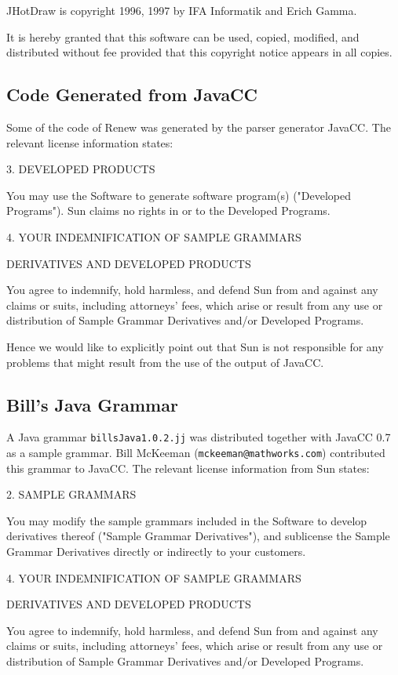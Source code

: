 \begin{licensequote}
JHotDraw is copyright 1996, 1997 by IFA Informatik and Erich Gamma.

It is hereby granted that this software can be used, copied, modified, 
and distributed without fee provided that this copyright notice appears 
in all copies.
\end{licensequote}


\subsection{Code Generated from JavaCC}

Some of the code of Renew was generated by the parser generator
JavaCC. The relevant license information states:

\begin{licensequote}
3. DEVELOPED PRODUCTS

You may use the Software to generate software program(s) ("Developed
Programs").  Sun claims no rights in or to the Developed Programs.

\medskip

4. YOUR INDEMNIFICATION OF SAMPLE GRAMMARS

DERIVATIVES AND DEVELOPED PRODUCTS

You agree to indemnify, hold harmless, and defend Sun from and against
any claims or suits, including attorneys' fees, which arise or result
from any use or distribution of Sample Grammar Derivatives and/or
Developed Programs.
\end{licensequote}

Hence we would like to explicitly point out that Sun is not responsible
for any problems that might result from the use of the output of JavaCC.


\subsection{Bill's Java Grammar}

A Java grammar \texttt{billsJava1.0.2.jj} was distributed together with 
JavaCC 0.7 as a sample grammar. Bill McKeeman (\texttt{mckeeman@mathworks.com})
contributed this grammar to JavaCC. The relevant license information 
from Sun states:
\begin{licensequote}
2. SAMPLE GRAMMARS

You may modify the sample grammars included in the Software to develop
derivatives thereof ("Sample Grammar Derivatives"), and sublicense the
Sample Grammar Derivatives directly or indirectly to your customers.

\medskip

4. YOUR INDEMNIFICATION OF SAMPLE GRAMMARS

DERIVATIVES AND DEVELOPED PRODUCTS

You agree to indemnify, hold harmless, and defend Sun from and against
any claims or suits, including attorneys' fees, which arise or result
from any use or distribution of Sample Grammar Derivatives and/or
Developed Programs.
\end{licensequote}


